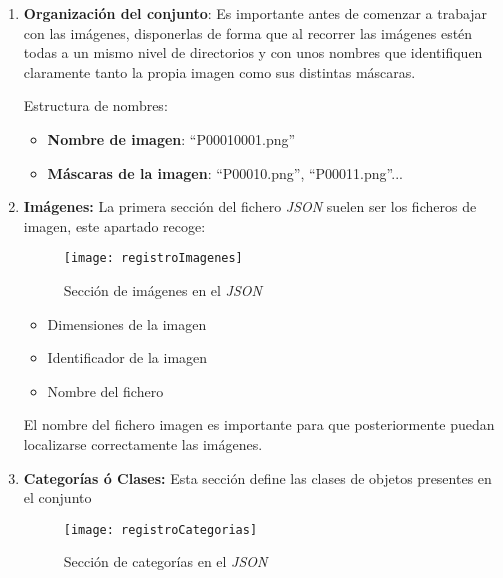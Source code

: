\begin{enumerate}
    \item \textbf{Organización del conjunto}: Es importante antes de comenzar a trabajar con las imágenes, disponerlas de forma que al recorrer las imágenes estén todas a un mismo nivel de directorios y con unos nombres que identifiquen claramente tanto la propia imagen como sus distintas máscaras.
    
    Estructura de nombres:
    \begin{itemize}
       \item \textbf{Nombre de imagen}: ``P0001\textunderscore0001.png''
       \item \textbf{Máscaras de la imagen}: ``P0001\textunderscore0.png'', ``P0001\textunderscore1.png''...
    \end{itemize}
    
    \item \textbf{Imágenes:} La primera sección del fichero \emph{JSON} suelen ser los ficheros de imagen, este apartado recoge:
    
    \begin{figure}[htb]
    \centering
    \texttt{[image: registroImagenes]}
    \caption[Sección de imágenes en el \emph{JSON}]{Sección de imágenes en el \emph{JSON}}
    \end{figure}
    
    \begin{itemize}
        \item Dimensiones de la imagen
        \item Identificador de la imagen
        \item Nombre del fichero
    \end{itemize}
    
    El nombre del fichero imagen es importante para que posteriormente puedan localizarse correctamente las imágenes.
    
    \clearpage
    
    \item \textbf{Categorías ó Clases:} Esta sección define las clases de objetos presentes en el conjunto
    
    \begin{figure}[htb]
    \centering
    \texttt{[image: registroCategorias]}
    \caption[Sección de categorías en el \emph{JSON}]{Sección de categorías en el \emph{JSON}}
    \end{figure}
        

\end{enumerate}

